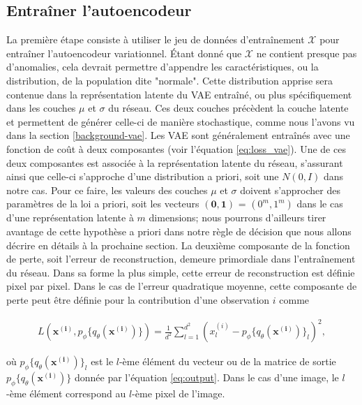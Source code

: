 \subsection{Entraîner l'autoencodeur} \label{meth:train-vae}

La première étape consiste à utiliser le jeu de données d'entraînement $\mathcal{X}$ pour entraîner l'autoencodeur variationnel. Étant donné que $\mathcal{X}$ ne contient presque pas d'anomalies, cela devrait permettre d'appendre les caractéristiques, ou la distribution, de la population dite "normale". Cette distribution apprise sera contenue dans la représentation latente du VAE entraîné, ou plus spécifiquement dans les couches $\mu$ et $\sigma$ du réseau. Ces deux couches précèdent la couche latente et permettent de générer celle-ci de manière stochastique, comme nous l'avons vu dans la section \ref{background-vae}. Les VAE sont généralement entraînés avec une fonction de coût à deux composantes (voir l'équation \ref{eq:loss_vae}). Une de ces deux composantes est associée à la représentation latente du réseau, s'assurant ainsi que celle-ci s'approche d'une distribution a priori, soit une $N(0, I)$ dans notre cas. Pour ce faire, les valeurs des couches $\mu$ et $\sigma$ doivent s'approcher des paramètres de la loi a priori, soit les vecteurs $(\mathbf{0}, \mathbf{1})$ = $(0^m, 1^m)$ dans le cas d'une représentation latente à $m$ dimensions; nous pourrons d'ailleurs tirer avantage de cette hypothèse a priori dans notre règle de décision que nous allons décrire en détails à la prochaine section. La deuxième composante de la fonction de perte, soit l'erreur de reconstruction, demeure primordiale dans l'entraînement du réseau. Dans sa forme la plus simple, cette erreur de reconstruction est définie pixel par pixel. Dans le cas de l'erreur quadratique moyenne, cette composante de perte peut être définie pour la contribution d'une observation $i$ comme

\begin{gather} \label{eq:mse_loss}
L(\boldsymbol{x^{(i)}}, p_\phi\{q_\theta(\boldsymbol{x^{(i)}})\}) = \frac{1}{d^2} \sum_{l=1}^{d^2} (x^{(i)}_{l} - p_\phi\{q_\theta(\boldsymbol{x^{(i)}})\}_l)^2,
\end{gather}

où $p_\phi\{q_\theta(\boldsymbol{x^{(i)}})\}_l$ est le $l$-ème élément du vecteur ou de la matrice de sortie $p_\phi\{q_\theta(\boldsymbol{x^{(i)}})\}$ donnée par l'équation \ref{eq:output}. Dans le cas d'une image, le $l$-ème élément correspond au $l$-ème  pixel de l'image.

